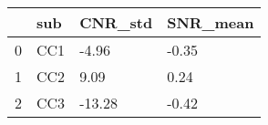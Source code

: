 \begin{tabular}{llll}
\toprule
{} &  sub & CNR\_std & SNR\_mean \\
\midrule
0 &  CC1 &   -4.96 &    -0.35 \\
1 &  CC2 &    9.09 &     0.24 \\
2 &  CC3 &  -13.28 &    -0.42 \\
\bottomrule
\end{tabular}
